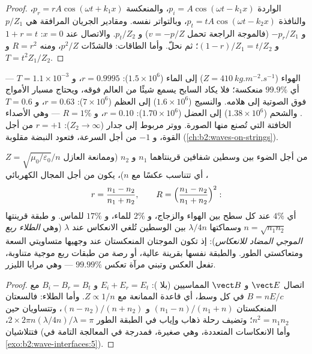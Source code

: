 \begin{proof}
الواردة $p_i = A\cos(\omega t - k_1x)$، والمنعكسة $p_r = rA\cos(\omega t + k_1x)$،
والنافذة $p_t = tA\cos(\omega t - k_2x)$، وبالتواتر نفسه. ومقادير
الجريان المرافقة هي $p/Z_1$ و $-p_r/Z_1$ (فالموجة الراجعة تحمل
$v = -p/Z$) و $p_t/Z_2$. والاتصال عند $x = 0$: $1 + r = t$ و $(1 - r)/Z_1
= t/Z_2$؛ ثم نحلّ. وأما الطاقات: فالشدّات $p^2/Z$، ومنه $R = r^2$ و
$T = t^2Z_1/Z_2$.
\end{proof}

\begin{example}\label{ex:b2:wave-interfaces:sound}
الهواء ($Z = \qty{410}{kg.m^{-2}.s^{-1}}$) إلى الماء ($1.5 \times 10^6$): $r = 0.9995$،
و $T = 1.1 \times 10^{-3}$ --- أي $99.9\%$ منعكسة؛ فلا يكاد السابح يسمع شيئًا
من العالم فوقه، ويحتاج مسبار الأمواج فوق الصوتية إلى هلامه. والنسيج
($1.6 \times 10^6$) إلى العظم ($7 \times 10^6$): $r = 0.63$، و $T = 0.6$. والشحم ($1.38 \times
10^6$) إلى العضل ($1.70 \times 10^6$): $r = 0.10$، و $R = 1\%$ --- وهي الأصداء الخافتة التي
تُصنع منها الصورة. ووتر مربوط إلى جدار ($Z_2 \to \infty$): $r = +1$ من أجل
القوة، و $-1$ من أجل السرعة، فتعود النبضة مقلوبة
(\cref{ch:b2:waves-on-strings}).
\end{example}

\begin{proposition}\label{prop:b2:wave-interfaces:optics}
من أجل الضوء بين وسطين شفافين قرينتاهما $n_1$ و $n_2$ (وممانعة
العازل $Z = \sqrt{\mu_0/\varepsilon_0}/n$، أي تتناسب عكسًا
مع $n$)، يكون من أجل المجال الكهربائي
\[
r = \frac{n_1 - n_2}{n_1 + n_2} , \qquad R = \Bigl(\frac{n_1 - n_2}{n_1 + n_2}\Bigr)^2 :
\]
أي $4\%$ عند كل سطح بين الهواء والزجاج، و $2\%$ للماء، و $17\%$ للماس. و
طبقة قرينتها $n = \sqrt{n_1n_2}$ وسماكتها $\lambda/4n$ بين الوسطين
تُلغي الانعكاس عند $\lambda$ (وهي \emph{الطلاء ربع الموجي المضاد
للانعكاس}): إذ تكون الموجتان المنعكستان عند وجهيها متساويتي السعة
ومتعاكستي الطور. والطبقة نفسها بقرينة عالية، أو رصة من
طبقات ربع موجية متناوبة، تفعل العكس وتبني
مرآة تعكس $99.99\%$ --- وهي مرايا الليزر.
\end{proposition}

\begin{proof}
اتصال $\vect E$ و $\vect B$ المماسيين (بلا ): $E_i + E_r = E_t$ و $B_i - B_r = B_t$ مع $B = nE/c$ في كل
وسط، أي قاعدة الممانعة مع $Z \propto 1/n$. وأما الطلاء: فالسعتان
المنعكستان $(n_1 - n)/(n_1 + n)$ و $(n - n_2)/(n + n_2)$،
وتتساويان حين $n^2 = n_1n_2$؛ وتضيف رحلة ذهاب وإياب في الطبقة الطور
$2\times2\pi n(\lambda/4n)/\lambda = \pi$، فتتلاشيان (وأما الانعكاسات المتعددة،
وهي صغيرة، فمدرجة في المعالجة التامة في \cref{exo:b2:wave-interfaces:5}).
\end{proof}


